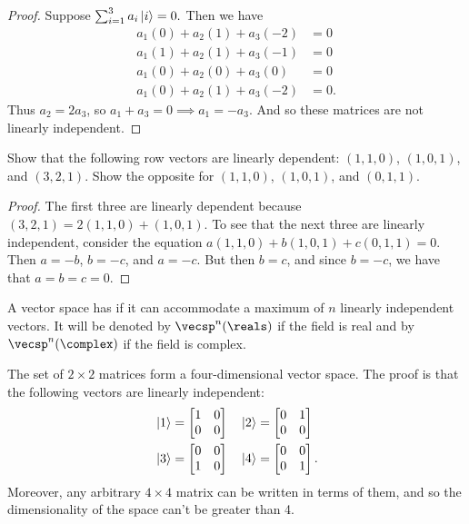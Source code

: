 \begin{proof}
Suppose $\sum_{i = 1}^3 a_i \ket{i} = 0.$ Then we have
\begin{align*}
    a_1(0) + a_2(1) + a_3(-2) &= 0\\
    a_1(1) + a_2(1) + a_3(-1) &= 0\\
    a_1(0) + a_2(0) + a_3(0)  &= 0\\
    a_1(0) + a_2(1) + a_3(-2) &= 0.
\end{align*}
Thus $a_2 = 2a_3$, so $a_1 + a_3 = 0 \implies a_1 = -a_3$. And so these matrices are not linearly independent.
\end{proof}

\begin{exercise}
Show that the following row vectors are linearly dependent: $(1, 1, 0)$, $(1, 0, 1)$, and $(3, 2, 1)$. Show the opposite for $(1, 1, 0)$, $(1, 0, 1)$, and $(0, 1, 1)$.
\end{exercise}

\begin{proof}
The first three are linearly dependent because $(3, 2, 1) = 2(1, 1, 0) + (1, 0, 1)$. To see that the next three are linearly independent, consider the equation $a(1, 1, 0) + b(1, 0, 1) + c(0, 1, 1) = 0$. Then $a = -b$, $b = -c$, and $a = -c$. But then $b = c$, and since $b = -c$, we have that $a = b = c = 0$.
\end{proof}

\begin{shaded*}
A vector space has  if it can accommodate a maximum of $n$ linearly independent vectors. It will be denoted by $\vecsp^n(\reals)$ if the field is real and by $\vecsp^n(\complex)$ if the field is complex.
\end{shaded*}

\begin{example}
The set of $2 \times 2$ matrices form a four-dimensional vector space. The proof is that the following vectors are linearly independent:
\begin{align*}
&\ket{1} = 
\begin{bmatrix}
1 & 0 \\
0 & 0
\end{bmatrix}
\quad
\ket{2} = 
\begin{bmatrix}
0 & 1 \\
0 & 0
\end{bmatrix}
\\
&\ket{3} = 
\begin{bmatrix}
0 & 0 \\
1 & 0
\end{bmatrix}
\quad
\ket{4} = 
\begin{bmatrix}
0 & 0 \\
0 & 1
\end{bmatrix}.
\end{align*}
Moreover, any arbitrary $4 \times 4$ matrix can be written in terms of them, and so the dimensionality of the space can't be greater than 4.
\end{example}

